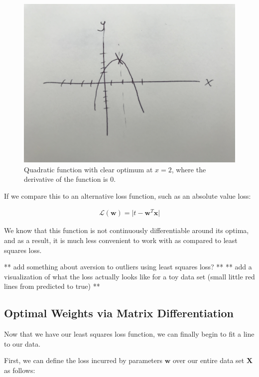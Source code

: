 \begin{figure}[H]
    \centering
    \includegraphics[width=0.5\paperwidth]{../LinearRegression/fig/deriv_at_2.jpg}
    \caption{Quadratic function with clear optimum at $x=2$, where the derivative of the function is 0.}
    \label{fig:quad-deriv-at-2}
\end{figure}

If we compare this to an alternative loss function, such as an absolute value loss:

\begin{align}
    \mathcal{L}(\textbf{w}) = \lvert t - \textbf{w}^{T}\textbf{x} \rvert
\end{align}

We know that this function is not continuously differentiable around its optima, and as a result, it is much less convenient to work with as compared to least squares loss.

** add something about aversion to outliers using least squares loss? **
** add a visualization of what the loss actually looks like for a toy data set (small little red lines from predicted to true) **

\subsection{Optimal Weights via Matrix Differentiation}
Now that we have our least squares loss function, we can finally begin to fit a line to our data.

First, we can define the loss incurred by parameters $\textbf{w}$ over our entire data set $\textbf{X}$ as follows:

